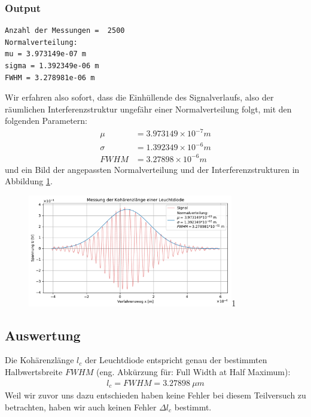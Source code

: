 \documentclass[a4paper,10pt]{article}
\begin{document}
\subsubsection{Output}
\begin{lstlisting}
Anzahl der Messungen =  2500
Normalverteilung:
mu = 3.973149e-07 m
sigma = 1.392349e-06 m
FWHM = 3.278981e-06 m

\end{lstlisting}
Wir erfahren also sofort, dass die Einhüllende des Signalverlaufs, also der räumlichen Interferenzstruktur ungefähr einer Normalverteilung folgt, mit den folgenden Parametern:
\begin{align*}
\mu&= 3.973149\times10^{-7} m\\
\sigma&= 1.392349\times10^{-6} m\\
FWHM&= 3.27898\times10^{-6} m
\end{align*}
und ein Bild der angepassten Normalverteilung und der Interferenzstrukturen in Abbildung \ref{fig:Fig4}.
\begin{figure}[htb]
  \centering
  \begin{annotate}{\includegraphics[width=0.8\textwidth]{232_Fig4.pdf}}{1}
  \end{annotate}
\caption{}
\label{fig:Fig4}
\end{figure}
\subsection{Auswertung}
Die Kohärenzlänge \(l_c\) der Leuchtdiode entspricht genau der bestimmten Halbwertsbreite \(FWHM\) (eng. Abkürzung für: Full Width at Half Maximum):
\begin{align*}
l_c = FWHM = 3.27898\:{\mu m}
\end{align*}
Weil wir zuvor uns dazu entschieden haben keine Fehler bei diesem Teilversuch zu betrachten, haben wir auch keinen Fehler \(\Delta l_c\) bestimmt.
\end{document}
